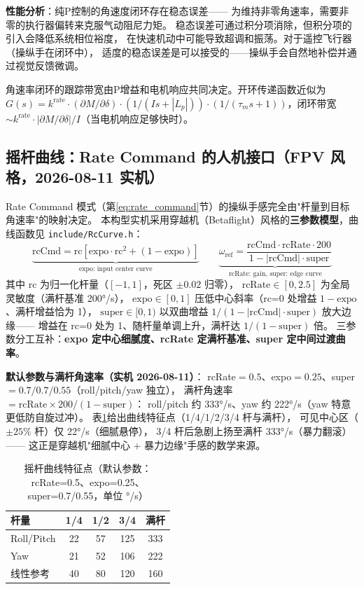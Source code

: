 \textbf{性能分析}：纯P控制的角速度闭环存在稳态误差——
为维持非零角速率，需要非零的执行器偏转来克服气动阻尼力矩。
稳态误差可通过积分项消除，但积分项的引入会降低系统相位裕度，
在快速机动中可能导致超调和振荡。对于遥控飞行器（操纵手在闭环中），
适度的稳态误差是可以接受的——操纵手会自然地补偿并通过视觉反馈微调。

角速率闭环的跟踪带宽由P增益和电机响应共同决定。开环传递函数近似为
$G(s) = k^{\text{rate}} \cdot (\partial M / \partial \delta) \cdot
(1/(I s + |L_p|)) \cdot (1/(\tau_m s + 1))$，闭环带宽$\sim k^{\text{rate}}
\cdot |\partial M / \partial \delta| / I$（当电机响应足够快时）。

\subsection{摇杆曲线：Rate Command 的人机接口（FPV 风格，2026-08-11 实机）}
\label{sec:rc_curve}

Rate Command 模式（第\ref{eq:rate_command}节）的操纵手感完全由"杆量到目标角速率"的映射决定。
本构型实机采用穿越机（Betaflight）风格的\textbf{三参数模型}，曲线函数见 \texttt{include/RcCurve.h}：
\begin{equation}
    \underbrace{\text{rcCmd} = \text{rc}\left[\text{expo}\cdot\text{rc}^2 + (1-\text{expo})\right]}_{\text{expo: input center curve}}
    \qquad
    \underbrace{\omega_{\text{ref}} = \frac{\text{rcCmd}\cdot\text{rcRate}\cdot 200}{1 - |\text{rcCmd}|\cdot\text{super}}}_{\text{rcRate: gain, super: edge curve}}
    \label{eq:rc_curve}
\end{equation}
其中 rc 为归一化杆量（$[-1,1]$，死区 $\pm0.02$ 归零），
$\text{rcRate}\in[0,2.5]$ 为全局灵敏度（满杆基准 200°/s），
$\text{expo}\in[0,1]$ 压低中心斜率（rc=0 处增益 $1-\text{expo}$、满杆增益恰为 1），
$\text{super}\in[0,1)$ 以双曲增益 $1/(1-|\text{rcCmd}|\cdot\text{super})$ 放大边缘——
增益在 rc=0 处为 1、随杆量单调上升，满杆达 $1/(1-\text{super})$ 倍。
三参数分工互补：\textbf{expo 定中心细腻度、rcRate 定满杆基准、super 定中间过渡曲率}。

\textbf{默认参数与满杆角速率（实机 2026-08-11）}：
rcRate$=0.5$、expo$=0.25$、super$=0.7/0.7/0.55$（roll/pitch/yaw 独立），
满杆角速率 $=\text{rcRate}\times 200/(1-\text{super})$：
roll/pitch 约 333°/s、yaw 约 222°/s（yaw 特意更低防自旋过冲）。
表\ref{tab:rc_curve_points}给出曲线特征点（1/4/1/2/3/4 杆与满杆），
可见中心区（$\pm25\%$ 杆）仅 22°/s（细腻悬停），
3/4 杆后急剧上扬至满杆 333°/s（暴力翻滚）——
这正是穿越机"细腻中心 + 暴力边缘"手感的数学来源。

\begin{table}[H]
\centering
\caption{摇杆曲线特征点（默认参数：rcRate=0.5、expo=0.25、super=0.7/0.55，单位 °/s）}
\label{tab:rc_curve_points}
\begin{tabular}{l c c c c}
\toprule
杆量 & 1/4 & 1/2 & 3/4 & 满杆 \\
\midrule
Roll/Pitch & 22 & 57 & 125 & 333 \\
Yaw & 21 & 52 & 106 & 222 \\
线性参考 & 40 & 80 & 120 & 160 \\
\bottomrule
\end{tabular}
\end{table}

